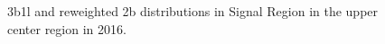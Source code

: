 \begin{figure}[ht]
 
 
    \caption{3b1l and reweighted 2b distributions in Signal Region in the upper center region in 2016.}
    \label{fig:upper-center-3b1l-SR-2016}
\end{figure}


